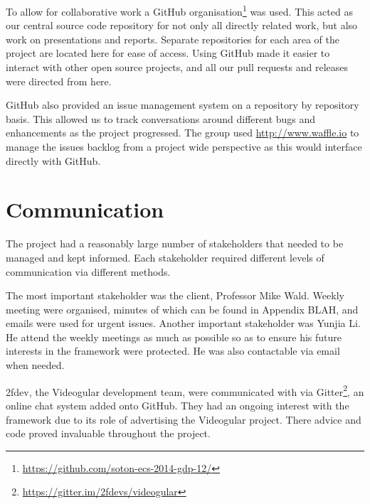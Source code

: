 To allow for collaborative work a GitHub organisation\footnote{\url{https://github.com/soton-ecs-2014-gdp-12/}} was used. This acted as our central source code repository for not only all directly related work, but also work on presentations and reports. Separate repositories for each area of the project are located here for ease of access. Using GitHub made it easier to interact with other open source projects, and all our pull requests and releases were directed from here. 

GitHub also provided an issue management system on a repository by repository basis. This allowed us to track conversations around different bugs and enhancements as the project progressed.
The group used \url{http://www.waffle.io} to manage the issues backlog from a project wide perspective as this would interface directly with GitHub.

\section{Communication} 
\label{Section:Communication}

The project had a reasonably large number of stakeholders that needed to be managed and kept informed. Each stakeholder required different levels of communication via different methods.

The most important stakeholder was the client, Professor Mike Wald. Weekly meeting were organised, minutes of which can be found in Appendix BLAH, and emails were used for urgent issues. 
Another important stakeholder was Yunjia Li. He attend the weekly meetings as much as possible so as to ensure his future interests in the framework were protected. He was also contactable via email when needed.

2fdev, the Videogular development team, were communicated with via Gitter\footnote{\url{https://gitter.im/2fdevs/videogular}}, an online chat system added onto GitHub. They had an ongoing interest with the framework due to its role of advertising the Videogular project.  There advice and code proved invaluable throughout the project.




